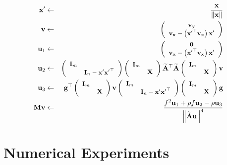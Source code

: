 \documentclass{article}
\newcommand{\x}{\mathbf{x}}
\newcommand{\A}{\mathbf{A}}
\newcommand{\0}{\textbf{0}}
\newcommand{\X}{\mathbf{X}}
\newcommand{\I}{\mathbf{I}}
\newcommand{\g}{\mathbf{g}}
\newcommand{\M}{\mathbf{M}}
\newcommand{\y}{\mathbf{y}}
\newcommand{\tmu}{\mathbf{u}}
\newcommand{\tmv}{\mathbf{v}}
\begin{document}
\begin{eqnarray*}
  \x' & \leftarrow & \frac{\x}{\left\| \x \right\|}\\
  \tmv & \leftarrow & \small{\left(\begin{array}{c}
    \tmv_{\y}\\
    \tmv_{\x} - \left( {\x'}^{\top} \tmv_{\x} \right) \x'
  \end{array}\right)}\\
  \tmu_1 & \leftarrow & \small{\left(\begin{array}{c}
    \0\\
    \tmv_{\x} - \left( {\x'}^{\top} \tmv_{\x} \right) \x'
  \end{array}\right)}\\
  \tmu_2 & \leftarrow & \small{\small{\left(\begin{array}{cc}
    \I_m & \\
    & \I_n - \x' {\x'}^{\top}
  \end{array}\right)} \left(\begin{array}{cc}
    \I_m & \\
    & \X
  \end{array}\right) \widetilde{\A}^{\top} \widetilde{\A}
  \left(\begin{array}{cc}
    \I_m & \\
    & \X
  \end{array}\right) \tmv}\\
  \tmu_3 & \leftarrow & \small{\g^{\top} \left(\begin{array}{cc}
    \I_m & \\
    & \X
  \end{array}\right) \tmv \left(\begin{array}{cc}
    \I_m & \\
    & \I_n - \x' {\x'}^{\top}
  \end{array}\right) \left(\begin{array}{cc}
    \I_m & \\
    & \X
  \end{array}\right) \g}\\
  \M \tmv & \leftarrow & \frac{f^2 \tmu_1 + \rho f \tmu_2 - \rho
  \tmu_3}{\left\| \widetilde{\A} \tmu \right\|^4}
\end{eqnarray*}


\section{Numerical Experiments}
\end{document}
